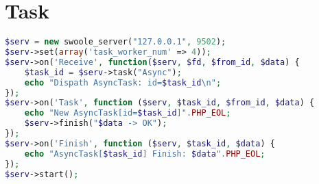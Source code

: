 \chapter{Task}


\begin{lstlisting}[language=PHP]
$serv = new swoole_server("127.0.0.1", 9502);
$serv->set(array('task_worker_num' => 4));
$serv->on('Receive', function($serv, $fd, $from_id, $data) {
    $task_id = $serv->task("Async");
    echo "Dispath AsyncTask: id=$task_id\n";
});
$serv->on('Task', function ($serv, $task_id, $from_id, $data) {
    echo "New AsyncTask[id=$task_id]".PHP_EOL;
    $serv->finish("$data -> OK");
});
$serv->on('Finish', function ($serv, $task_id, $data) {
    echo "AsyncTask[$task_id] Finish: $data".PHP_EOL;
});
$serv->start();
\end{lstlisting}




\begin{lstlisting}[language=PHP]

\end{lstlisting}






\begin{lstlisting}[language=PHP]

\end{lstlisting}




\begin{lstlisting}[language=PHP]

\end{lstlisting}




\begin{lstlisting}[language=PHP]

\end{lstlisting}




\begin{lstlisting}[language=PHP]

\end{lstlisting}




\begin{lstlisting}[language=PHP]

\end{lstlisting}




\begin{lstlisting}[language=PHP]

\end{lstlisting}




